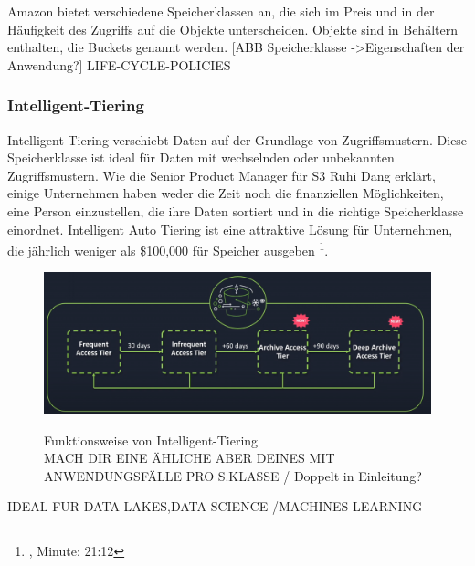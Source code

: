 Amazon bietet verschiedene Speicherklassen an, die sich im Preis und in der Häufigkeit des Zugriffs auf die Objekte unterscheiden. Objekte sind in Behältern enthalten, die Buckets genannt werden.
[ABB Speicherklasse ->Eigenschaften der Anwendung?]
LIFE-CYCLE-POLICIES

\subsubsection{Intelligent-Tiering}
Intelligent-Tiering verschiebt Daten auf der Grundlage von Zugriffsmustern. Diese Speicherklasse ist ideal für Daten mit wechselnden oder unbekannten Zugriffsmustern. 
Wie die Senior Product Manager für S3 Ruhi Dang erklärt, einige Unternehmen haben weder die Zeit noch die finanziellen Möglichkeiten, eine Person einzustellen, die ihre Daten sortiert und in die richtige Speicherklasse einordnet. Intelligent Auto Tiering ist eine attraktive Lösung für Unternehmen, die jährlich weniger als \$100,000 für Speicher ausgeben \footnote{\cite{AMZ16}, Minute: 21:12}.

\begin{figure}[h!]
  \centering
  \includegraphics[scale=0.5]{sources/S3_IntLifeCycle}
  \caption[Funktionsweise von Intelligent-Tiering]{}\label{fig:S3_IntLifeCycle} Funktionsweise von Intelligent-Tiering\\
  MACH DIR EINE ÄHLICHE ABER DEINES MIT ANWENDUNGSFÄLLE PRO S.KLASSE / Doppelt in Einleitung?
\end{figure}


IDEAL FUR DATA LAKES,DATA SCIENCE /MACHINES LEARNING

















